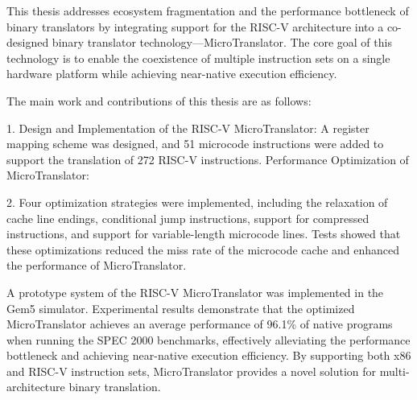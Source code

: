 This thesis addresses ecosystem fragmentation and the performance bottleneck of binary translators by integrating support for the RISC-V architecture into a co-designed binary translator technology—MicroTranslator. The core goal of this technology is to enable the coexistence of multiple instruction sets on a single hardware platform while achieving near-native execution efficiency.

The main work and contributions of this thesis are as follows:

1. Design and Implementation of the RISC-V MicroTranslator:
A register mapping scheme was designed, and 51 microcode instructions were added to support the translation of 272 RISC-V instructions.
Performance Optimization of MicroTranslator:

2. Four optimization strategies were implemented, including the relaxation of cache line endings, conditional jump instructions, support for compressed instructions, and support for variable-length microcode lines. Tests showed that these optimizations reduced the miss rate of the microcode cache and enhanced the performance of MicroTranslator.

A prototype system of the RISC-V MicroTranslator was implemented in the Gem5 simulator. Experimental results demonstrate that the optimized MicroTranslator achieves an average performance of 96.1\% of native programs when running the SPEC 2000 benchmarks, effectively alleviating the performance bottleneck and achieving near-native execution efficiency. By supporting both x86 and RISC-V instruction sets, MicroTranslator provides a novel solution for multi-architecture binary translation.


\pagestyle{enfrontmatterstyle}%
\cleardoublepage\pagestyle{frontmatterstyle}%

